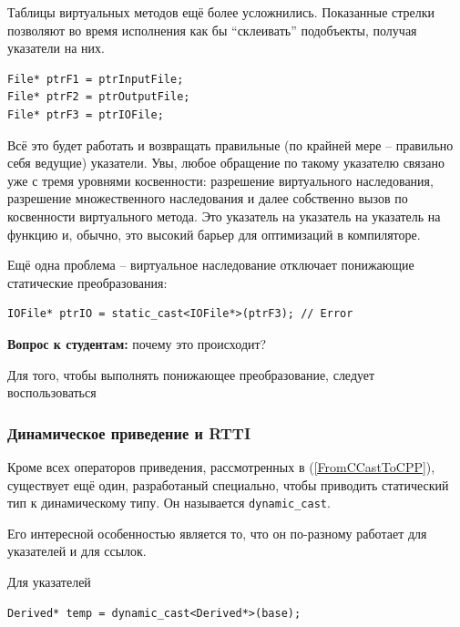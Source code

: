 \documentclass[a4paper,12pt,oneside]{article}
\newif\ifanswers
\begin{document}
Таблицы виртуальных методов ещё более усложнились. Показанные стрелки позволяют во время исполнения как бы ``склеивать'' подобъекты, получая указатели на них.

\begin{lstlisting}
File* ptrF1 = ptrInputFile;
File* ptrF2 = ptrOutputFile;
File* ptrF3 = ptrIOFile;
\end{lstlisting}

Всё это будет работать и возвращать правильные (по крайней мере -- правильно себя ведущие) указатели. Увы, любое обращение по такому указателю связано уже с тремя уровнями косвенности: разрешение виртуального наследования, разрешение множественного наследования и далее собственно вызов по косвенности виртуального метода. Это указатель на указатель на указатель на функцию и, обычно, это высокий барьер для оптимизаций в компиляторе.

Ещё одна проблема -- виртуальное наследование отключает понижающие статические преобразования:

\begin{lstlisting}
IOFile* ptrIO = static_cast<IOFile*>(ptrF3); // Error
\end{lstlisting}

\textbf{Вопрос к студентам:} почему это происходит?

\ifanswers
Правильный ответ: потому что для реконструкции объекта с виртуальным наследованием, компилятор должен пройти по каждой из возможных цепочек виртуального наследования и создать каждый из подобъектов. Это неконстантный оверхед по времени и памяти и разработчики языка не стали его закладывать в обычное преобразование.
\fi

Для того, чтобы выполнять понижающее преобразование, следует воспользоваться

\subsubsection{Динамическое приведение и RTTI}\label{DynCastRTTI}

Кроме всех операторов приведения, рассмотренных в (\ref{FromCCastToCPP}), существует ещё один, разработаный специально, чтобы приводить статический тип к динамическому типу. Он называется \lstinline!dynamic_cast!. 

Его интересной особенностью является то, что он по-разному работает для указателей и для ссылок. 

Для указателей

\begin{lstlisting}
Derived* temp = dynamic_cast<Derived*>(base);
\end{lstlisting}
\end{document}
